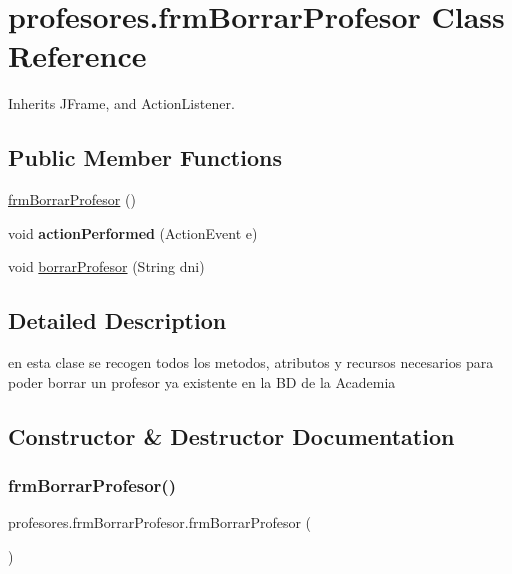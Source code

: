 \hypertarget{classprofesores_1_1frm_borrar_profesor}{}\section{profesores.\+frm\+Borrar\+Profesor Class Reference}
\label{classprofesores_1_1frm_borrar_profesor}


Inherits J\+Frame, and Action\+Listener.

\subsection*{Public Member Functions}
\begin{DoxyCompactItemize}
\item 
\hyperlink{classprofesores_1_1frm_borrar_profesor_a287f61b6dc156272afdb5548f3eb55b3}{frm\+Borrar\+Profesor} ()
\item 
\mbox{\label{classprofesores_1_1frm_borrar_profesor_aa5a057fd651c47f7c587033dbb94675f}} 
void {\bfseries action\+Performed} (Action\+Event e)
\item 
void \hyperlink{classprofesores_1_1frm_borrar_profesor_a4a696b4839a73c038bab645d5e1030eb}{borrar\+Profesor} (String dni)
\end{DoxyCompactItemize}


\subsection{Detailed Description}
en esta clase se recogen todos los metodos, atributos y recursos necesarios para poder borrar un profesor ya existente en la BD de la Academia 

\subsection{Constructor \& Destructor Documentation}
\mbox{\label{classprofesores_1_1frm_borrar_profesor_a287f61b6dc156272afdb5548f3eb55b3}} 
\subsubsection{\texorpdfstring{frm\+Borrar\+Profesor()}{frmBorrarProfesor()}}
{\footnotesize\ttfamily profesores.\+frm\+Borrar\+Profesor.\+frm\+Borrar\+Profesor (\begin{DoxyParamCaption}{ }\end{DoxyParamCaption})}

